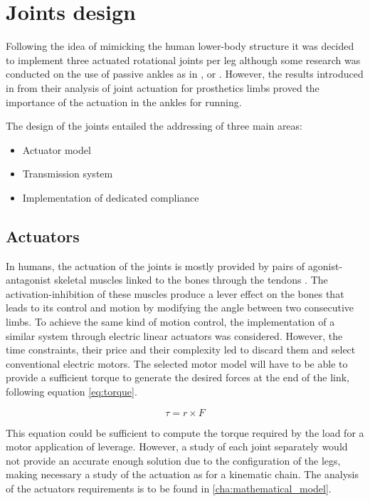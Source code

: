 \section{Joints design} %
\label{sec:joints}
Following the idea of mimicking the human lower-body structure it was decided to implement three actuated rotational joints per leg although some research was conducted on the use of passive ankles as in \cite{dacbot1}, \cite{phides} or \cite{mabel}.
However, the results introduced in \cite{grimmer} from their analysis of joint actuation for prosthetics limbs proved the importance of the actuation in the ankles for running.

The design of the joints entailed the addressing of three main areas:
\begin{itemize}
  \item Actuator model
  \item Transmission system
  \item Implementation of dedicated compliance
\end{itemize}

\subsection{Actuators} %
\label{sub:actuators}
In humans, the actuation of the joints is mostly provided by pairs of agonist-antagonist skeletal muscles linked to the bones through the tendons \cite{anatomy}.
The activation-inhibition of these muscles produce a lever effect on the bones that leads to its control and motion by modifying the angle between two consecutive limbs.
To achieve the same kind of motion control, the implementation of a similar system through electric linear actuators was considered.
However, the time constraints, their price and their complexity led to discard them and select conventional electric motors.
The selected motor model will have to be able to provide a sufficient torque to generate the desired forces at the end of the link, following equation \ref{eq:torque}.

\begin{equation}
\label{eq:torque}
  \tau = r \times F
\end{equation}

This equation could be sufficient to compute the torque required by the load for a motor application of leverage. 
However, a study of each joint separately would not provide an accurate enough solution due to the configuration of the legs, making necessary a study of the actuation as for a kinematic chain.
The analysis of the actuators requirements is to be found in \ref{cha:mathematical_model}.


